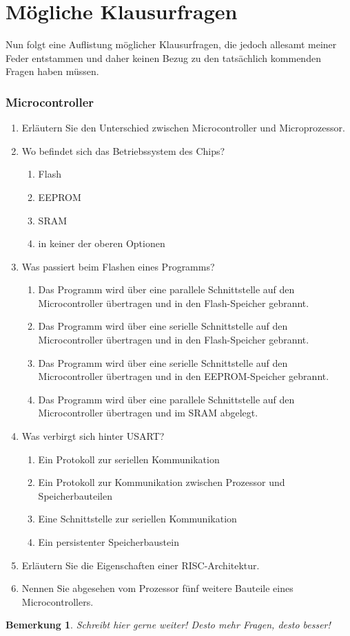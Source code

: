 \documentclass[11pt,a4paper]{scrartcl}
\newtheorem{note}{Bemerkung}
\begin{document}
\part{Mögliche Klausurfragen}
Nun folgt eine Auflistung möglicher Klausurfragen, die jedoch allesamt meiner Feder entstammen und daher keinen Bezug zu den tatsächlich kommenden Fragen haben müssen.
\section{Microcontroller}
\begin{enumerate}
\item Erläutern Sie den Unterschied zwischen Microcontroller und Microprozessor.
\item Wo befindet sich das Betriebssystem des Chips?
\begin{enumerate}
\item Flash
\item EEPROM
\item SRAM
\item in keiner der oberen Optionen
\end{enumerate}
\item Was passiert beim Flashen eines Programms?
\begin{enumerate}
\item Das Programm wird über eine parallele Schnittstelle auf den Microcontroller übertragen und in den Flash-Speicher gebrannt.
\item Das Programm wird über eine serielle Schnittstelle auf den Microcontroller übertragen und in den Flash-Speicher gebrannt.
\item Das Programm wird über eine serielle Schnittstelle auf den Microcontroller übertragen und in den EEPROM-Speicher gebrannt.
\item Das Programm wird über eine parallele Schnittstelle auf den Microcontroller übertragen und im SRAM abgelegt.
\end{enumerate}
\item Was verbirgt sich hinter USART?
\begin{enumerate}
\item Ein Protokoll zur seriellen Kommunikation
\item Ein Protokoll zur Kommunikation zwischen Prozessor und Speicherbauteilen
\item Eine Schnittstelle zur seriellen Kommunikation
\item Ein persistenter Speicherbaustein
\end{enumerate}
\item Erläutern Sie die Eigenschaften einer RISC-Architektur.
\item Nennen Sie abgesehen vom Prozessor fünf weitere Bauteile eines Microcontrollers.
\end{enumerate}
\begin{note}
Schreibt hier gerne weiter! Desto mehr Fragen, desto besser!
\end{note}
\end{document}
